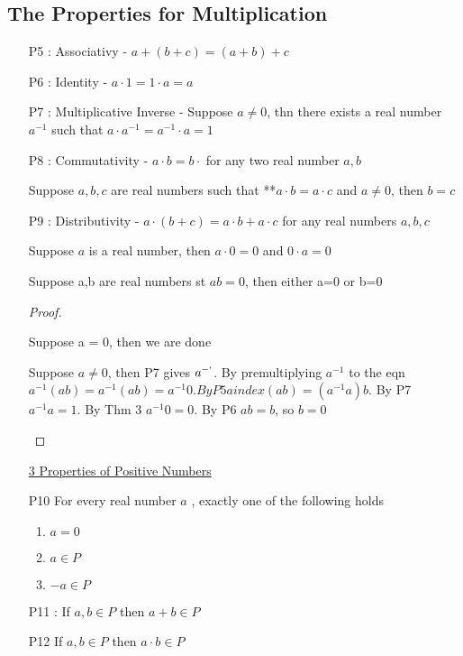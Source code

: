 \documentclass{report}
\begin{document}
    \subsection*{The Properties for Multiplication}%
      \begin{enumerate}
        \item[P5]: Associativy - $a + (b+c) = (a+b)+c$
        \item[P6]: Identity - $a \cdot 1 = 1 \cdot a = a$
        \item[P7]: Multiplicative Inverse - Suppose $a \neq 0$, thn
          there exists a real number $a^{-1}$ such that
          $a \cdot a^{-1} = a^{-1} \cdot a = 1$
        \item[P8]: Commutativity - $a \cdot b = b \cdot$
          for any two real number $a,b$

      \thm{ } {
        Suppose $a,b,c$ are real numbers such that {**}$a \cdot b=a \cdot c$
        and $a \neq 0$, then $b = c$
      }

        \item[P9]: Distributivity -
          $a \cdot (b +c) = a \cdot b  + a \cdot c$
          for any real numbers $a,b,c$

           {
            Suppose $a$ is a real number, then $a \cdot 0 = 0$ and
            $0 \cdot a = 0$
          }

       {
        Suppose a,b are real numbers st $ab=0$, then either a=0 or b=0
      }
      \begin{proof}
        \begin{case}
          Suppose a = 0, then we are done
        \end{case}
        \begin{case}
          Suppose $a \neq 0$, then P7 gives $a^{-`}$.
          By premultiplying $a^{-1}$ to the eqn
          $a^{-1}(a b) = a^{-1}(ab) = a ^{-1}0.
          By P5 a index(ab) = (a ^{-1} a) b$.  By P7 $a ^{-1} a = 1$.
          By Thm 3 $a ^{-1} 0 = 0$.  By P6 $a b = b$, so $b=0$

        \end{case}
      \end{proof}

    \underline{3 Properties of Positive Numbers}
    \item[P10] For every real number $a$ , exactly one of the following
      holds
      \begin{enumerate}
        \item $a=0$
        \item $a \in P$
        \item $-a \in P$
      \end{enumerate}
    \item[P11]: If $a,b \in P$ then $a+b \in P$
    \item[P12] If $a,b \in P$ then $a \cdot b \in P$
  \end{enumerate}
\end{document}
